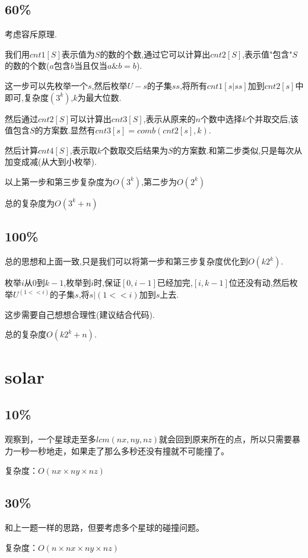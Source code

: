 \documentclass[10pt,a4paper,twoside]{article}
\begin{document}
			\subsection{60\%}
				考虑容斥原理.
				
				我们用$cnt1[S]$表示值为$S$的数的个数,通过它可以计算出$cnt2[S]$,表示值"包含"$S$的数的个数($a$包含$b$当且仅当$a\&b = b$).
				
				这一步可以先枚举一个$s$,然后枚举$U-s$的子集$ss$,将所有$cnt1[s|ss]$加到$cnt2[s]$中即可,复杂度$(3^k)$,$k$为最大位数.
				
				然后通过$cnt2[S]$可以计算出$cnt3[S]$,表示从原来的$n$个数中选择$k$个并取交后,该值包含$S$的方案数.显然有$cnt3[s] = comb(cnt2[s],k)$.
				
				然后计算$cnt4[S]$,表示取$k$个数取交后结果为$S$的方案数.和第二步类似,只是每次从加变成减(从大到小枚举).
				
				以上第一步和第三步复杂度为$O(3^k)$,第二步为$O(2^k)$
				
				总的复杂度为$O(3^k + n)$
			\subsection{100\%}
				总的思想和上面一致,只是我们可以将第一步和第三步复杂度优化到$O(k2^k)$.
				
				枚举$i$从$0$到$k-1$,枚举到$i$时,保证$[0,i-1]$已经加完,$[i,k-1]$位还没有动,然后枚举$U ^ (1<<i)$的子集$s$,将$s | (1<<i)$加到$s$上去.
				
				这步需要自己想想合理性(建议结合代码).
				
				总的复杂度$O(k2^k + n)$.
	
			\newpage
	\section{solar}
		\subsection{10\%}
			观察到，一个星球走至多$lcm(nx,ny,nz)$就会回到原来所在的点，所以只需要暴力一秒一秒地走，如果走了那么多秒还没有撞就不可能撞了。
			
			复杂度：$O(nx \times ny \times nz)$
		\subsection{30\%}
			和上一题一样的思路，但要考虑多个星球的碰撞问题。
			
			复杂度：$O(n \times nx \times ny \times nz)$
		
\end{document}
